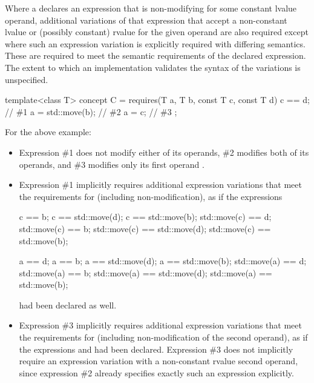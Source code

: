 \pnum
Where a  declares an expression that is
non-modifying for some constant lvalue operand, additional variations of that
expression that accept a non-constant lvalue or (possibly constant) rvalue for
the given operand are also required except where such an expression variation is
explicitly required with differing semantics. These
 are required to meet the semantic
requirements of the declared expression. The extent to which an implementation
validates the syntax of the variations is unspecified.

\pnum
\begin{example}
\begin{codeblock}
template<class T> concept C = requires(T a, T b, const T c, const T d) {
  c == d;           // \#1
  a = std::move(b); // \#2
  a = c;            // \#3
};
\end{codeblock}

For the above example:
\begin{itemize}
\item
Expression \#1 does not modify either of its operands, \#2 modifies both of its
operands, and \#3 modifies only its first operand .

\item
Expression \#1 implicitly requires additional expression variations that meet
the requirements for  (including non-modification), as if the
expressions
\begin{codeblock}
                                            c  ==           b;
          c  == std::move(d);               c  == std::move(b);
std::move(c) ==           d;      std::move(c) ==           b;
std::move(c) == std::move(d);     std::move(c) == std::move(b);

          a  ==           d;                a  ==           b;
          a  == std::move(d);               a  == std::move(b);
std::move(a) ==           d;      std::move(a) ==           b;
std::move(a) == std::move(d);     std::move(a) == std::move(b);
\end{codeblock}
had been declared as well.

\item
Expression \#3 implicitly requires additional expression variations that meet
the requirements for  (including non-modification of the second
operand), as if the expressions  and  had
been declared. Expression \#3 does not implicitly require an expression
variation with a non-constant rvalue second operand, since expression \#2
already specifies exactly such an expression explicitly.
\end{itemize}
\end{example}

